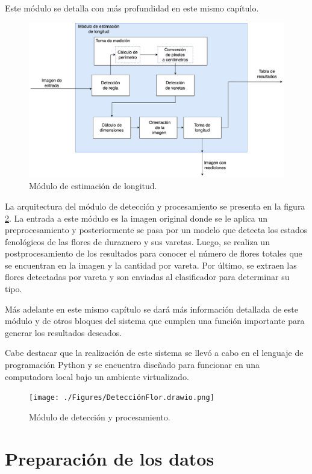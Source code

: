 Este módulo se detalla con más profundidad en este mismo capítulo.

\begin{figure}[htpb]
	\centering
	\includegraphics[scale=.35]{./Figures/medicionVareta.drawio.png}
	\caption{Módulo de estimación de longitud.}
	\label{fig:varetaSize}
\end{figure}

La arquitectura del módulo de detección y procesamiento se presenta en la figura \ref{fig:densidadDeFlores}. La entrada a este módulo es la imagen original donde se le aplica un preprocesamiento y posteriormente se pasa por un modelo que detecta los estados fenológicos de las flores de duraznero y sus varetas. Luego, se realiza un postprocesamiento de los resultados para conocer el número de flores totales que se encuentran en la imagen y la cantidad por vareta. Por último, se extraen las flores detectadas por vareta y son enviadas al clasificador para determinar su tipo.

Más adelante en este mismo capítulo se dará más información detallada de este módulo y de otros bloques del sistema que cumplen una función importante para generar los resultados deseados.

Cabe destacar que la realización de este sistema se llevó a cabo en el lenguaje de programación Python y se encuentra diseñado para funcionar en una computadora local bajo un ambiente virtualizado. 

\begin{figure}[htp]
	\centering
	\texttt{[image: ./Figures/DetecciónFlor.drawio.png]}
	\caption{Módulo de detección y procesamiento.}
	\label{fig:densidadDeFlores}
\end{figure}
\newpage
\section{Preparación de los datos}

